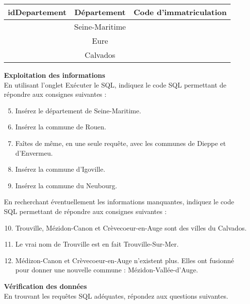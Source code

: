 \documentclass[a4paper,12pt,french]{book}
\begin{document}
\begin{exercice}[ : Collectivites.db]
\begin{center}
\begin{tabular}{|c|c|c|}
	\hline
\rowcolor{UGLiOrange}\color{white} idDepartement &\color{white}	\textbf{Département} & \color{white}\textbf{Code d'immatriculation} \\
	\hline
	&Seine-Maritime  & \\
	\hline
	&Eure&  \\
\hline
	&Calvados&  \\
\hline

\end{tabular}
\end{center}

\textbf{Exploitation des informations}\\

En utilisant l’onglet \og Exécuter le SQL\fg{}, indiquez le code SQL permettant de répondre aux consignes suivantes :\\
\begin{enumerate}[\bfseries 1.]
	\setcounter{enumi}{4}
	\item 	Insérez le département de Seine-Maritime.
	\item 	Insérez la commune de Rouen.
	\item 	Faîtes de même, en une seule requête, avec les communes de Dieppe et d’Envermeu.
	\item 	Insérez la commune d’Igoville.
	\item 	Insérez la commune du Neubourg.	\\
\end{enumerate}
En recherchant éventuellement les informations manquantes, indiquez le code SQL permettant de répondre aux consignes suivantes :\\
\begin{enumerate}[\bfseries 1.]
		\setcounter{enumi}{9}
	\item 	Trouville, Mézidon-Canon et Crèvecoeur-en-Auge sont des villes du Calvados.
	\item 	Le vrai nom de Trouville est en fait Trouville-Sur-Mer.
	\item 	Médizon-Canon et Crèvecoeur-en-Auge n’existent plus. Elles ont fusionné pour donner une nouvelle commune : Mézidon-Vallée-d’Auge.\\
\end{enumerate}
\textbf{Vérification des données}\\

En trouvant les requêtes SQL adéquates, répondez aux questions suivantes.


\end{exercice}
\end{document}
